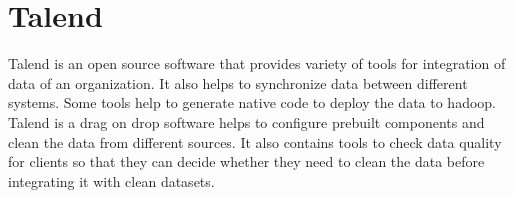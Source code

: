\section{Talend}

Talend is an open source software that provides variety of tools for integration
 of data of an organization. It also helps to synchronize data between different
 systems. Some tools help to generate native code to deploy the data to hadoop.
Talend is a drag on drop software helps to configure prebuilt components and
clean the data from different sources. It also contains tools to check data
quality for clients so that they can decide whether they need to clean the data
before integrating it with clean datasets.~\cite{hid-sp18-502-Talend}


